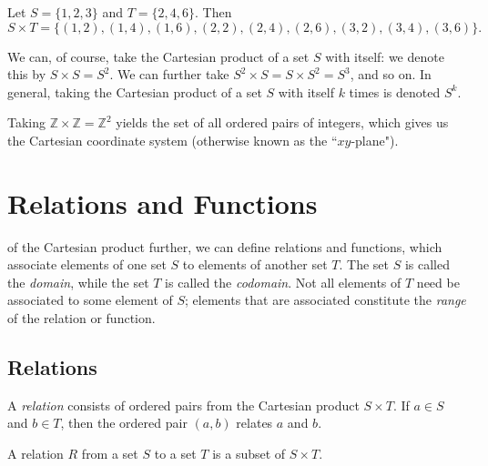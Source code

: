 \begin{example}
Let $S = \{1, 2, 3\}$ and $T = \{2, 4, 6\}$. Then
\begin{equation*}
S \times T = \{(1,2), (1,4), (1,6), (2,2), (2,4), (2,6), (3,2), (3,4), (3,6)\}.
\end{equation*}
\end{example}

We can, of course, take the Cartesian product of a set $S$ with itself: we denote this by $S \times S = S^{2}$. We can further take $S^{2} \times S = S \times S^{2} = S^{3}$, and so on. In general, taking the Cartesian product of a set $S$ with itself $k$ times is denoted $S^{k}$.

\begin{example}
Taking $\mathbb{Z} \times \mathbb{Z} = \mathbb{Z}^{2}$ yields the set of all ordered pairs of integers, which gives us the Cartesian coordinate system (otherwise known as the ``$xy$-plane").
\end{example}

\section{Relations and Functions}

 of the Cartesian product further, we can define relations and functions, which associate elements of one set $S$ to elements of another set $T$. The set $S$ is called the \emph{domain}, while the set $T$ is called the \emph{codomain}. Not all elements of $T$ need be associated to some element of $S$; elements that are associated constitute the \emph{range} of the relation or function.

\subsection*{Relations}

A \emph{relation} consists of ordered pairs from the Cartesian product $S \times T$. If $a \in S$ and $b \in T$, then the ordered pair $(a,b)$ relates $a$ and $b$.

\begin{definition}[Relation]
A relation $R$ from a set $S$ to a set $T$ is a subset of $S \times T$.
\end{definition}

